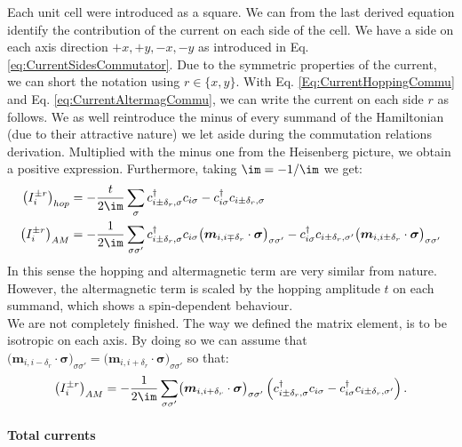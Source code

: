 \documentclass[../main.tex]{subfile}
\begin{document}
Each unit cell were introduced as a square. We can from the last derived equation identify the contribution of the current on each side of the cell. We have a side on 
each axis direction $+x, +y, -x, -y$ as introduced in Eq. \ref{eq:CurrentSidesCommutator}. Due to the symmetric properties of the current, we can short the notation
using $r\in\{x,y\}$. With Eq. \ref{Eq:CurrentHoppingCommu} and Eq. \ref{eq:CurrentAltermagCommu}, we can write the current on each side $r$ as follows.
We as well reintroduce the minus of every summand of the Hamiltonian (due to their attractive nature) we let aside during the commutation relations derivation. Multiplied 
with the minus one from the Heisenberg picture, we obtain a positive expression. Furthermore, taking $\im = -1/\im$ we get:
\begin{align}
    \left(I_{i}^{\pm r}\right)_{hop} &= -\frac{t}{2\im}\sum_{\sigma}c_{i\pm\delta_r,\sigma}^{\dagger}c_{i\sigma} -c_{i\sigma}^{\dagger}c_{i\pm\delta_r,\sigma}  \\
    \left(I_{i}^{\pm r}\right)_{AM} &=  -\frac{1}{2\im}\sum_{\sigma\sigma'}c_{i\pm\delta_r,\sigma}^{\dagger}c_{i\sigma}\bigl(\bm{m}_{i,i\mp\delta_r}\cdot\bm{\sigma}\bigr)_{\sigma\sigma'} - c_{i\sigma}^{\dagger}c_{i\pm\delta_r,\sigma'}\bigl(\bm{m}_{i,i\pm\delta_r}\cdot\bm{\sigma}\bigr)_{\sigma\sigma'} 
\end{align}
In this sense the hopping and altermagnetic term are very similar from nature. However, the altermagnetic term is scaled by the hopping amplitude $t$ on each summand, 
which shows a spin-dependent behaviour.\\

We are not completely finished. The way we defined the matrix element, is to be isotropic on each axis. By doing so we can 
assume that $\bigl(\bm{m}_{i,i-\delta_r}\cdot\bm{\sigma}\bigr)_{\sigma\sigma'} = \bigl(\bm{m}_{i,i+\delta_r}\cdot\bm{\sigma}\bigr)_{\sigma\sigma'}$ so that:
\begin{equation}
    \left(I_{i}^{\pm r}\right)_{AM} =  -\frac{1}{2\im}\sum_{\sigma\sigma'}\bigl(\bm{m}_{i,i+\delta_r}\cdot\bm{\sigma}\bigr)_{\sigma\sigma'}\left(c_{i\pm\delta_r,\sigma}^{\dagger}c_{i\sigma} - c_{i\sigma}^{\dagger}c_{i\pm\delta_r,\sigma'}\right).
\end{equation}

\paragraph{Total currents}$~$\\
\end{document}
